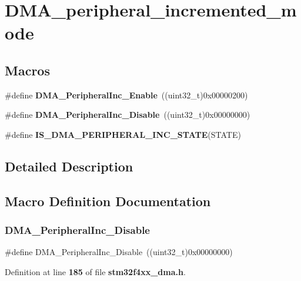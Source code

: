 \section{D\+M\+A\+\_\+peripheral\+\_\+incremented\+\_\+mode}
\label{group__DMA__peripheral__incremented__mode}
\subsection*{Macros}
\begin{DoxyCompactItemize}
\item 
\#define \textbf{ D\+M\+A\+\_\+\+Peripheral\+Inc\+\_\+\+Enable}~((uint32\+\_\+t)0x00000200)
\item 
\#define \textbf{ D\+M\+A\+\_\+\+Peripheral\+Inc\+\_\+\+Disable}~((uint32\+\_\+t)0x00000000)
\item 
\#define \textbf{ I\+S\+\_\+\+D\+M\+A\+\_\+\+P\+E\+R\+I\+P\+H\+E\+R\+A\+L\+\_\+\+I\+N\+C\+\_\+\+S\+T\+A\+TE}(S\+T\+A\+TE)
\end{DoxyCompactItemize}


\subsection{Detailed Description}


\subsection{Macro Definition Documentation}
\mbox{\label{group__DMA__peripheral__incremented__mode_ga0fe3ff9c67bec802dd239fd17c3dbd31}} 
\subsubsection{D\+M\+A\+\_\+\+Peripheral\+Inc\+\_\+\+Disable}
{\footnotesize\ttfamily \#define D\+M\+A\+\_\+\+Peripheral\+Inc\+\_\+\+Disable~((uint32\+\_\+t)0x00000000)}



Definition at line \textbf{ 185} of file \textbf{ stm32f4xx\+\_\+dma.\+h}.

